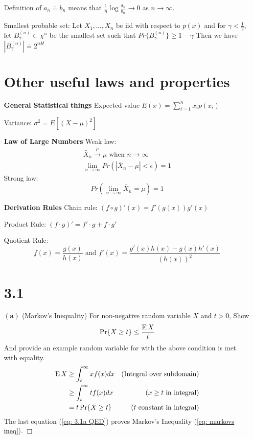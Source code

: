 \documentclass[10pt]{article}
\DeclareMathOperator*{\E}{\mbox{\text{E}}}
\newcommand{\pref}[1]{{(\ref{#1})}}
\begin{document}
\begin{scriptsize}
\begin{multicols}{3}
Definition of $a_n \doteq b_n$ means that $\frac{1}{n}\log \frac{a_n}{b_n} \rightarrow 0$ as $n\rightarrow \infty$.

Smallest probable set: Let $X_1,\ldots, X_n$ be iid with respect to $p(x)$ and for $\gamma < \frac{1}{2}$, let $B_\gamma^{(n)} \subset \chi^n$ be the smallest set such that $Pr\{ B_\gamma^{(n)} \} \geq 1-\gamma $ Then we have $|B_\gamma^{(n)}| \doteq 2^{nH}$

\section*{Other useful laws and properties}
{\bf General Statistical things} Expected value $E(x)=\sum_{i=1}^n x_i p(x_i)$

Variance: $\sigma^2 = E\left[ \left(X-\mu\right)^2\right]$

{\bf Law of Large Numbers} Weak law:
\begin{eqnarray*}
\bar{X}_n\overset{p}\rightarrow \mu \text{ when } n \rightarrow \infty\\
\lim_{n\rightarrow \infty} Pr\left(|\bar{X}_n-\mu| < \epsilon \right) = 1
\end{eqnarray*}
Strong law:
\begin{equation}
Pr\left(\lim_{n\rightarrow \infty} \bar{X}_n = \mu \right) = 1
\end{equation}

{\bf Derivation Rules} Chain rule: $(f \circ g)'(x)=f'(g(x))g'(x)$

Product Rule: $(f\cdot g)' = f' \cdot g + f \cdot g'$

Quotient Rule: \[f(x)=\frac{g(x)}{h(x)}\text{ and }f'(x)=\frac{g'(x)h(x)-g(x)h'(x)}{\left(h(x)\right)^2}\]


\section*{3.1}
$\mathbf{(a)}$
(Markov's Inequality) For non-negative random variable $X$ and  $t>0$,
Show
\begin{equation}
    \Pr\{X \geq t\} \leq \frac{\E X}{t} \label{eq: markovs ineq}
\end{equation}
And provide an example random variable for with the above condition is met
with equality.
\proof
\begin{eqnarray}
    \E X %
    &\geq \int_t^\infty x f(x)dx &\text{(Integral over subdomain)} 
    \nonumber \\
    &\geq \int_t^\infty t f(x)dx &\text{($x \geq t$ in integral)} 
        \nonumber \\
    &= t \Pr\{X \geq t\}  &\text{($t$ constant in integral)}
        \label{eq: 3.1a QED}
\end{eqnarray}
The last equation \pref{eq: 3.1a QED} proves Markov's Inequality
\pref{eq: markovs ineq}. $\Box$


\end{multicols}
\end{scriptsize}
\end{document}
